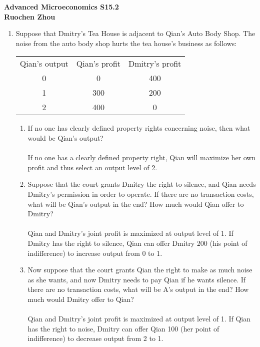 \documentclass[11pt]{article}
\begin{document}
\begin{center}
\textbf{Advanced Microeconomics S15.2\\}
\textbf{Ruochen Zhou}
\end{center}

\begin{enumerate}
\item Suppose that Dmitry's Tea House is adjacent to Qian's Auto Body Shop. The noise from the auto body shop hurts the tea house's business as follows:
	\begin{center}
\begin{tabular}{ c c c }
 Qian's output & Qian's profit & Dmitry's profit \\
 0 & 0 & 400 \\
 1 & 300 & 200\\
 2 & 400 & 0
\end{tabular}
\end{center}
	\begin{enumerate}
	\item If no one has clearly defined property rights concerning noise, then what would be Qian's output?
	\smallskip\\\\
	If no one has a clearly defined property right, Qian will maximize her own profit and thus select an output level of 2.\\
	\item Suppose that the court grants Dmitry the right to silence, and Qian needs Dmitry's permission in order to operate. If there are no transaction costs, what will be Qian's output in the end? How much would Qian offer to Dmitry?
	\smallskip\\\\
	Qian and Dmitry's joint profit is maximized at output level of 1.  If Dmitry has the right to silence, Qian can offer Dmitry 200 (his point of indifference) to increase output from 0 to 1.\\   
	\item Now suppose that the court grants Qian the right to make as much noise as she wants, and now Dmitry needs to pay Qian if he wants silence. If there are no transaction costs, what will be A's output in the end? How much would Dmitry offer to Qian?
	\smallskip\\\\
	Qian and Dmitry's joint profit is maximized at output level of 1.  If Qian has the right to noise, Dmitry can offer Qian 100 (her point of indifference) to decrease output from 2 to 1.\\   

\end{enumerate}
\end{enumerate}
\end{document}
